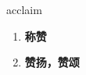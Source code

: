 
\begin{frame}
{\huge acclaim}
\begin{center}
\begin{enumerate}\Large
  \item \textbf{称赞}
  \item \textbf{赞扬，赞颂}
\end{enumerate}
\end{center}
\end{frame}
